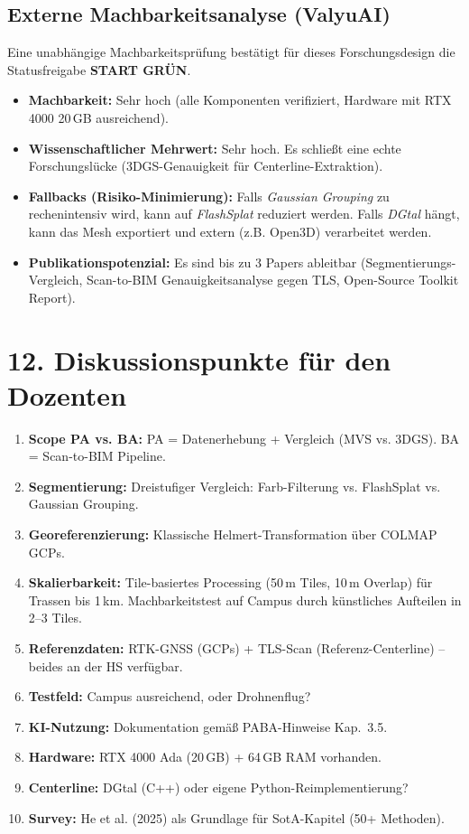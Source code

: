 \documentclass[11pt, a4paper]{article}
\begin{document}
\subsection{Externe Machbarkeitsanalyse (ValyuAI)}
Eine unabh\"angige Machbarkeitspr\"ufung best\"atigt f\"ur dieses Forschungsdesign die Statusfreigabe \textbf{START GR\"UN}. 
\begin{itemize}[noitemsep]
    \item \textbf{Machbarkeit:} Sehr hoch (alle Komponenten verifiziert, Hardware mit RTX 4000 20\,GB ausreichend).
    \item \textbf{Wissenschaftlicher Mehrwert:} Sehr hoch. Es schlie\ss t eine echte Forschungsl\"ucke (3DGS-Genauigkeit f\"ur Centerline-Extraktion).
    \item \textbf{Fallbacks (Risiko-Minimierung):} Falls \textit{Gaussian Grouping} zu rechenintensiv wird, kann auf \textit{FlashSplat} reduziert werden. Falls \textit{DGtal} h\"angt, kann das Mesh exportiert und extern (z.B. Open3D) verarbeitet werden.
    \item \textbf{Publikationspotenzial:} Es sind bis zu 3 Papers ableitbar (Segmentierungs-Vergleich, Scan-to-BIM Genauigkeitsanalyse gegen TLS, Open-Source Toolkit Report).
\end{itemize}

\section{12. Diskussionspunkte f\"ur den Dozenten}

\begin{enumerate}[noitemsep]
    \item \textbf{Scope PA vs. BA:} PA = Datenerhebung + Vergleich (MVS vs. 3DGS). BA = Scan-to-BIM Pipeline.
    \item \textbf{Segmentierung:} Dreistufiger Vergleich: Farb-Filterung vs. FlashSplat vs. Gaussian Grouping.
    \item \textbf{Georeferenzierung:} Klassische Helmert-Transformation \"uber COLMAP GCPs.
    \item \textbf{Skalierbarkeit:} Tile-basiertes Processing (50\,m Tiles, 10\,m Overlap) f\"ur Trassen bis 1\,km. Machbarkeitstest auf Campus durch k\"unstliches Aufteilen in 2--3 Tiles.
    \item \textbf{Referenzdaten:} RTK-GNSS (GCPs) + TLS-Scan (Referenz-Centerline) -- beides an der HS verf\"ugbar.
    \item \textbf{Testfeld:} Campus ausreichend, oder Drohnenflug?
    \item \textbf{KI-Nutzung:} Dokumentation gem\"a\ss{} PABA-Hinweise Kap.~3.5.
    \item \textbf{Hardware:} RTX 4000 Ada (20\,GB) + 64\,GB RAM vorhanden.
    \item \textbf{Centerline:} DGtal (C++) oder eigene Python-Reimplementierung?
    \item \textbf{Survey:} He et al. (2025) als Grundlage f\"ur SotA-Kapitel (50+ Methoden).
\end{enumerate}
\end{document}
